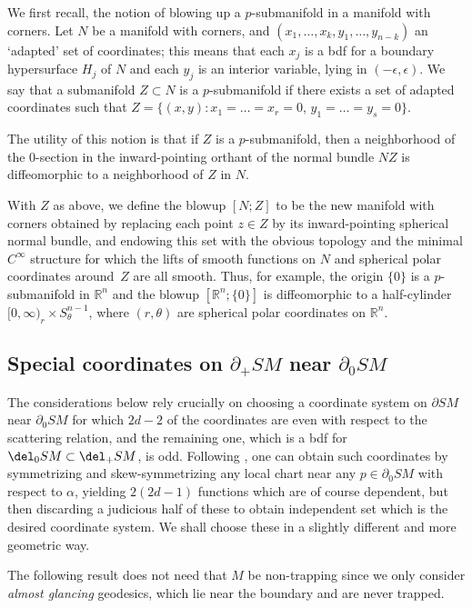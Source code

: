 We first recall, the notion of blowing up a $p$\nobreakdash-sub\-manifold in a manifold with corners. Let $N$ be a manifold with corners, and $(x_1, \ldots, x_k, y_1, \ldots, y_{n-k})$ an `adapted' set of coordinates; this means that each $x_j$ is a bdf for a boundary hypersurface $H_j$ of $N$ and each $y_j$ is an interior variable, lying in $(-\epsilon, \epsilon)$. We say that a submanifold $Z \subset N$ is a $p$-submanifold if there exists a set of adapted coordinates such that $Z = \{(x,y): x_1 = \ldots = x_r = 0$, $y_1 = \ldots = y_s = 0\}$.

The utility of this notion is that if $Z$ is a $p$-submanifold, then a neighborhood of the $0$-section in the inward-pointing orthant of the normal bundle $NZ$ is diffeomorphic to a neighborhood of $Z$ in $N$.

With $Z$ as above, we define the blowup $[N;Z]$ to be the new manifold with corners obtained by replacing each point $z \in Z$ by its inward-pointing spherical normal bundle, and endowing this set with the obvious topology and the minimal $C^\infty$ structure for which the lifts of smooth functions on $N$ and spherical polar coordinates around~$Z$ are all smooth. Thus, for example, the origin $\{0\}$ is a $p$-submanifold in $\mathbb R^n$ and the blowup $[\mathbb R^n; \{0\}]$ is diffeomorphic to a half-cylinder $[0,\infty)_r \times S^{n-1}_\theta$, where $(r,\theta)$ are spherical polar coordinates on $\mathbb R^n$.

\subsection{Special coordinates on $\partial_+ SM$ near $\partial_0 SM$} \label{sec:glancingCoords}

The considerations below rely crucially on choosing a coordinate system on $\partial SM$ near $\partial_0 SM$ for which $2d-2$
of the coordinates are even with respect to the scattering relation, and the remaining one, which is a bdf for $\del_0 SM \subset \del_+ SM$, is odd.
Following \cite[Th.\,C.4.5]{Hoermander2007}, one can obtain such coordinates by symmetrizing and skew-symmetrizing
any local chart near any $p\in \partial_0 SM$ with respect to $\alpha$, yielding $2(2d-1)$ functions which are of course dependent,
but then discarding a judicious half of these to obtain independent set which is the desired coordinate system. We shall
choose these in a slightly different and more geometric way.

The following result does not need that $M$ be non-trapping since we only consider {\it almost glancing} geodesics, which
lie near the boundary and are never trapped.

